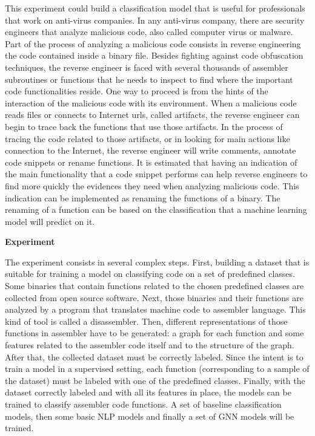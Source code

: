 This experiment could build a classification model that is useful for professionals that work on anti-virus companies. In any anti-virus company, there are security engineers that analyze malicious code, also called computer virus or malware. Part of the process of analyzing a malicious code consists in reverse engineering the code contained inside a binary file. Besides fighting against code obfuscation techniques, the reverse engineer is faced with several thousands of assembler subroutines or functions that he needs to inspect to find where the important code functionalities reside. One way to proceed is from the hints of the interaction of the malicious code with its environment. When a malicious code reads files or connects to Internet urls, called artifacts, the reverse engineer can begin to trace back the functions that use those artifacts. In the process of tracing the code related to those artifacts, or in looking for main actions like connection to the Internet, the reverse engineer will write comments, annotate code snippets or rename functions.
It is estimated that having an indication of the main functionality that a code snippet performs can help reverse engineers to find more quickly the evidences they need when analyzing malicious code. This indication can be implemented as renaming the functions of a binary. The renaming of a function can be based on the classification that a machine learning model will predict on it.



\textbf{Experiment}

The experiment consists in several complex steps.
First, building a dataset that is suitable for training a model on classifying code on a set of predefined classes. Some binaries that contain functions related to the chosen predefined classes are collected from open source software.  
Next, those binaries and their functions are analyzed by a program that translates machine code to assembler language. This kind of tool is called a disassembler.
Then, different representations of those functions in assembler have to be generated: a graph for each function and some features related to the assembler code itself and to the structure of the graph.
After that, the collected dataset must be correctly labeled. Since the intent is to train a model in a supervised setting, each function (corresponding to a sample of the dataset) must be labeled with one of the predefined classes.
Finally, with the dataset correctly labeled and with all its features in place, the models can be trained to classify assembler code functions. A set of baseline classification models, then some basic NLP models and finally a set of GNN models will be trained. 

